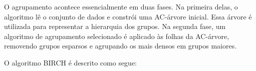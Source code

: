 \begin{figure}[!ht]
	\centering
\end{figure}

O agrupamento acontece essencialmente em duas fases. Na primeira delas, o algoritmo lê o conjunto de dados e constrói uma AC-árvore inicial. Essa árvore é utilizada para representar a hierarquia dos grupos. Na segunda fase, um algoritmo de agrupamento selecionado é aplicado às folhas da AC-árvore, removendo grupos esparsos e agrupando os mais densos em grupos maiores.

O algoritmo BIRCH é descrito como segue:

